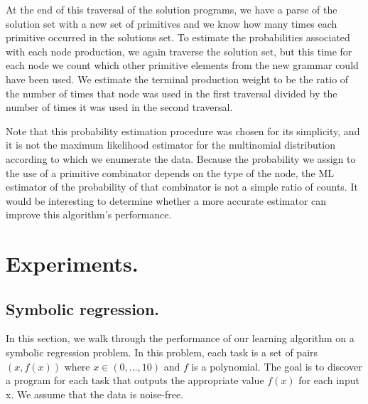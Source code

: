 \documentclass{article}
\begin{document}
At the end of this traversal of the solution programs, we have a parse
of the solution set with a new set of primitives and we know how many
times each primitive occurred in the solutions set. To estimate the
probabilities associated with each node production, we again traverse
the solution set, but this time for each node we count which other
primitive elements from the new grammar could have been used. We
estimate the terminal production weight to be the ratio of the number
of times that node was used in the first traversal divided by the
number of times it was used in the second traversal. 

Note that this probability estimation procedure was chosen for its
simplicity, and it is not the maximum likelihood estimator for the
multinomial distribution according to which we enumerate the
data. Because the probability we assign to the use of a primitive
combinator depends on the type of the node, the ML estimator of the
probability of that combinator is not a simple ratio of counts. It
would be interesting to determine whether a more accurate estimator
can improve this algorithm's performance.

\section{Experiments.}
\subsection{Symbolic regression.}

In this section, we walk through the performance of our learning
algorithm on a symbolic regression problem. In this problem,
each task is a set of pairs $ (x, f(x))$ where $x \in (0, \dots, 10)$
and $f$ is a polynomial. The goal is to discover a program for each
task that outputs the appropriate value $f(x)$ for each input x. We
assume that the data is noise-free.


\end{document}
